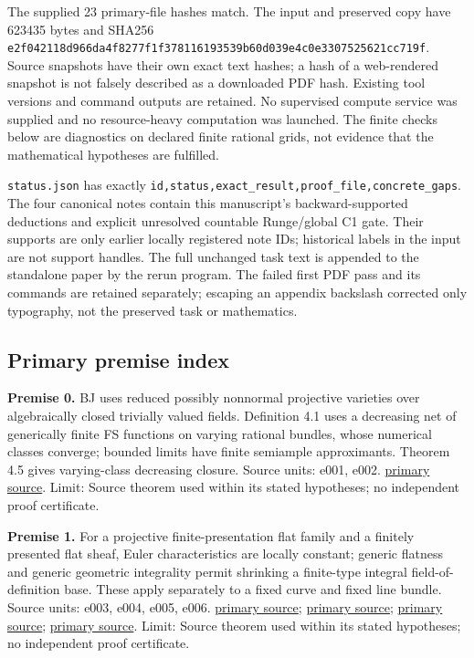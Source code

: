 \documentclass[
  10pt,
]{article}
\begin{document}
The supplied 23 primary-file hashes match. The input and preserved copy
have 623435 bytes and SHA256
\texttt{e2f042118d966da4f8277f1f378116193539b60d039e4c0e3307525621cc719f}.
Source snapshots have their own exact text hashes; a hash of a
web-rendered snapshot is not falsely described as a downloaded PDF hash.
Existing tool versions and command outputs are retained. No supervised
compute service was supplied and no resource-heavy computation was
launched. The finite checks below are diagnostics on declared finite
rational grids, not evidence that the mathematical hypotheses are
fulfilled.

\texttt{status.json} has exactly
\texttt{id,status,exact\_result,proof\_file,concrete\_gaps}. The four
canonical notes contain this manuscript's backward-supported deductions
and explicit unresolved countable Runge/global C1 gate. Their supports
are only earlier locally registered note IDs; historical labels in the
input are not support handles. The full unchanged task text is appended
to the standalone paper by the rerun program. The failed first PDF pass
and its commands are retained separately; escaping an appendix backslash
corrected only typography, not the preserved task or mathematics.

\subsection{Primary premise index}\label{primary-premise-index}

\textbf{Premise 0.} BJ uses reduced possibly nonnormal projective
varieties over algebraically closed trivially valued fields. Definition
4.1 uses a decreasing net of generically finite FS functions on varying
rational bundles, whose numerical classes converge; bounded limits have
finite semiample approximants. Theorem 4.5 gives varying-class
decreasing closure. Source units: e001, e002.
\href{https://arxiv.org/pdf/1801.08229v4}{primary source}. Limit: Source
theorem used within its stated hypotheses; no independent proof
certificate.

\textbf{Premise 1.} For a projective finite-presentation flat family and
a finitely presented flat sheaf, Euler characteristics are locally
constant; generic flatness and generic geometric integrality permit
shrinking a finite-type integral field-of-definition base. These apply
separately to a fixed curve and fixed line bundle. Source units: e003,
e004, e005, e006.
\href{https://stacks.math.columbia.edu/tag/0B9T}{primary source};
\href{https://stacks.math.columbia.edu/tag/052A}{primary source};
\href{https://stacks.math.columbia.edu/tag/0574}{primary source};
\href{https://stacks.math.columbia.edu/tag/0553}{primary source}. Limit:
Source theorem used within its stated hypotheses; no independent proof
certificate.
\end{document}
